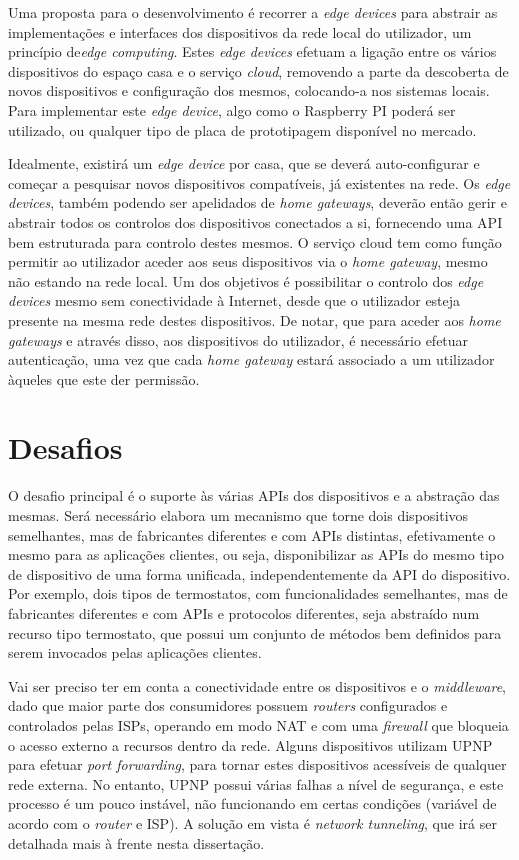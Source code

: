 Uma proposta para o desenvolvimento é recorrer a \textit{edge devices} para abstrair as implementações e interfaces dos dispositivos da rede local do utilizador, um princípio de\textit{edge computing}. Estes \textit{edge devices} efetuam a ligação entre os vários dispositivos do espaço casa e o serviço \textit{cloud}, removendo a parte da descoberta de novos dispositivos e configuração dos mesmos, colocando-a nos sistemas locais. Para implementar este \textit{edge device}, algo como o Raspberry PI poderá ser utilizado, ou qualquer tipo de placa de prototipagem disponível no mercado.

Idealmente, existirá um \textit{edge device} por casa, que se deverá auto-configurar e começar a pesquisar novos dispositivos compatíveis, já existentes na rede. Os \textit{edge devices}, também podendo ser apelidados de \textit{home gateways}, deverão então gerir e abstrair todos os controlos dos dispositivos conectados a si, fornecendo uma API bem estruturada para controlo destes mesmos. O serviço cloud tem como função permitir ao utilizador aceder aos seus dispositivos via o \textit{home gateway}, mesmo não estando na rede local. Um dos objetivos é possibilitar o controlo dos \textit{edge devices} mesmo sem conectividade à Internet, desde que o utilizador esteja presente na mesma rede destes dispositivos. De notar, que para aceder aos \textit{home gateways} e através disso, aos dispositivos do utilizador, é necessário efetuar autenticação, uma vez que cada \textit{home gateway} estará associado a um utilizador àqueles que este der permissão. 

\section{Desafios}

O desafio principal é o suporte às várias APIs dos dispositivos e a abstração das mesmas. Será necessário elabora um mecanismo que torne dois dispositivos semelhantes, mas de fabricantes diferentes e com APIs distintas, efetivamente o mesmo para as aplicações clientes, ou seja, disponibilizar as APIs do mesmo tipo de dispositivo de uma forma unificada, independentemente da API do dispositivo. Por exemplo, dois tipos de termostatos, com funcionalidades semelhantes, mas de fabricantes diferentes e com APIs e protocolos diferentes, seja abstraído num recurso tipo termostato, que possui um conjunto de métodos bem definidos para serem invocados pelas aplicações clientes.

Vai ser preciso ter em conta a conectividade entre os dispositivos e o \textit{middleware}, dado que maior parte dos consumidores possuem \textit{routers} configurados e controlados pelas ISPs, operando em modo NAT e com uma \textit{firewall} que bloqueia o acesso externo a recursos dentro da rede. Alguns dispositivos utilizam UPNP para efetuar \textit{port forwarding}, para tornar estes dispositivos acessíveis de qualquer rede externa. No entanto, UPNP possui várias falhas a nível de segurança, e este processo é um pouco instável, não funcionando em certas condições (variável de acordo com o \textit{router} e ISP). A solução em vista é \textit{network tunneling}, que irá ser detalhada mais à frente nesta dissertação. 

